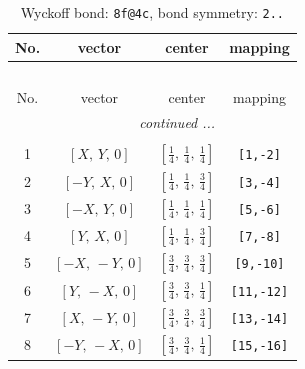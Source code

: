 \documentclass[fleqn,8pt]{jsarticle}
\begin{document}
\begin{longtable}{cccc}
\caption{Wyckoff bond: {\tt 8f@4c}, bond symmetry: {\tt 2..}}
 \\
 \hline \hline
No. & vector & center & mapping \\ \hline \endfirsthead

\multicolumn{3}{l}{\tablename\ \thetable{}} \\
 \hline \hline
No. & vector & center & mapping \\ \hline \endhead

 \hline \hline
\multicolumn{3}{r}{\footnotesize\it continued ...} \\ \endfoot

 \hline \hline
\multicolumn{3}{r}{} \\ \endlastfoot

1 & $\left[ X,\, Y,\, 0 \right]$ & $\left[ \frac{1}{4},\, \frac{1}{4},\, \frac{1}{4} \right]$ & {\tt [1,-2]} \\ \hline
2 & $\left[ - Y,\, X,\, 0 \right]$ & $\left[ \frac{1}{4},\, \frac{1}{4},\, \frac{3}{4} \right]$ & {\tt [3,-4]} \\ \hline
3 & $\left[ - X,\, Y,\, 0 \right]$ & $\left[ \frac{1}{4},\, \frac{1}{4},\, \frac{1}{4} \right]$ & {\tt [5,-6]} \\ \hline
4 & $\left[ Y,\, X,\, 0 \right]$ & $\left[ \frac{1}{4},\, \frac{1}{4},\, \frac{3}{4} \right]$ & {\tt [7,-8]} \\ \hline
5 & $\left[ - X,\, - Y,\, 0 \right]$ & $\left[ \frac{3}{4},\, \frac{3}{4},\, \frac{3}{4} \right]$ & {\tt [9,-10]} \\ \hline
6 & $\left[ Y,\, - X,\, 0 \right]$ & $\left[ \frac{3}{4},\, \frac{3}{4},\, \frac{1}{4} \right]$ & {\tt [11,-12]} \\ \hline
7 & $\left[ X,\, - Y,\, 0 \right]$ & $\left[ \frac{3}{4},\, \frac{3}{4},\, \frac{3}{4} \right]$ & {\tt [13,-14]} \\ \hline
8 & $\left[ - Y,\, - X,\, 0 \right]$ & $\left[ \frac{3}{4},\, \frac{3}{4},\, \frac{1}{4} \right]$ & {\tt [15,-16]} \\
\end{longtable}
\renewcommand{\arraystretch}{1.2}
\end{document}
